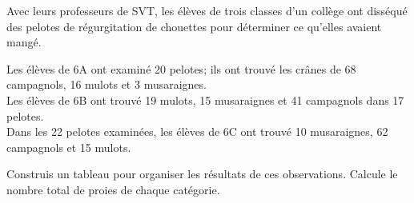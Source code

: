 Avec leurs professeurs de SVT, les élèves de trois classes d'un
collège ont disséqué des pelotes de régurgitation de chouettes pour
déterminer ce qu'elles avaient mangé.
\par Les élèves de 6\ieme A ont examiné 20 pelotes; ils ont trouvé les
crânes de 68 campagnols, 16 mulots et 3 musaraignes.
\\Les élèves de 6\ieme B ont trouvé 19 mulots, 15 musaraignes et 41
campagnols dans 17 pelotes.
\\Dans les 22 pelotes examinées, les élèves de 6\ieme C ont trouvé 10
musaraignes, 62 campagnols et 15 mulots.
\par Construis un tableau pour organiser les résultats de ces
observations. Calcule le nombre total de proies de chaque catégorie.